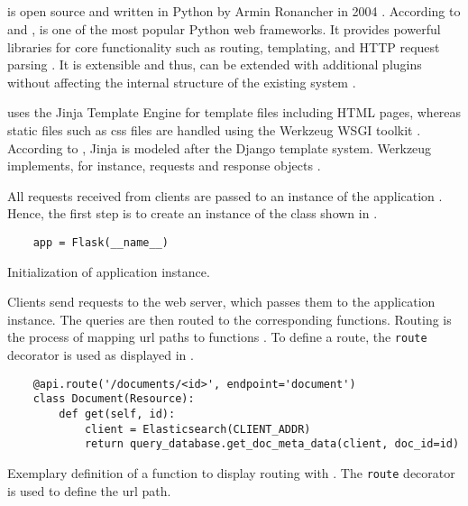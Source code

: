 \subsection{\flask{}}\label{sec:BE_flask}

\flask{} is open source and written in Python by Armin Ronancher in 2004 \cite{flask2015, mvc_flask2019}.
According to \citeauthor{flask_book2015} and \citeauthor{mvc_flask2019}, \flask{} is one of the most popular Python web frameworks.
It provides powerful libraries for core functionality such as routing, templating, and HTTP request parsing \cite{flask_book2015}.
It is extensible and thus, can be extended with additional plugins without affecting the internal structure of the existing system \cite{flask2015}.

\flask{} uses the Jinja Template Engine for template files including HTML pages,
whereas static files such as \ac{css} files are handled using the Werkzeug WSGI toolkit \cite{flask2015}.
According to \citeauthor{flask2015}, Jinja is modeled after the Django template system.
Werkzeug implements, for instance, requests and response objects \cite{mvc_flask2019}.

All requests received from clients are passed to an instance of the \flask{} application \cite{flask_book2018}.
Hence, the first step is to create an instance of the \flask{} class shown in .

\begin{listing}[htp]
    \begin{verbatim}
    app = Flask(__name__)
    \end{verbatim}
    \caption[Initialization of a \flask{} application instance]{Initialization of \flask{} application instance.
    }
    \label{lst:flask_app_init}
\end{listing}

Clients send requests to the web server, which passes them to the \flask{} application instance.
The queries are then routed to the corresponding functions.
Routing is the process of mapping \ac{url} paths to functions \cite{flask_book2018}.
To define a route, the \texttt{route} decorator is used as displayed in .

\begin{listing}[htp]
    \begin{verbatim}
    @api.route('/documents/<id>', endpoint='document')
    class Document(Resource):
        def get(self, id):
            client = Elasticsearch(CLIENT_ADDR)
            return query_database.get_doc_meta_data(client, doc_id=id)
    \end{verbatim}
    \caption[Routing using \flask{}]{Exemplary definition of a function to display routing with \flask{}.
    The \texttt{route} decorator is used to define the \ac{url} path.
    }
    \label{lst:flask_routing}
\end{listing}

